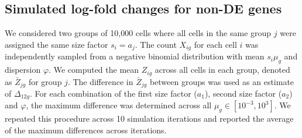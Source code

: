 \documentclass[10pt,letterpaper]{article}
\begin{document}
\subsection{Simulated log-fold changes for non-DE genes}
We considered two groups of 10,000 cells where all cells in the same group $j$ were assigned the same size factor $s_i=a_j$.
The count $X_{ig}$ for each cell $i$ was independently sampled from a negative binomial distribution with mean $s_i\mu_g$ and dispersion $\varphi$.
We computed the mean $Z_{ig}$ across all cells in each group, denoted as $\bar Z_{jg}$ for group $j$.
The difference in $\bar Z_{jg}$ between groups was used as an estimate of $\Delta_{12g}$.
For each combination of the first size factor ($a_1$), second size factor ($a_2$) and $\varphi$, the maximum difference was determined across all $\mu_g \in [10^{-3}, 10^3]$.
We repeated this procedure across 10 simulation iterations and reported the average of the maximum differences across iterations.



\end{document}
